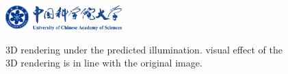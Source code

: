 \begin{figure}[!htbp]
    \centering
    \includegraphics[width=0.40\textwidth]{Img/ucas_logo.pdf}

    {3D rendering under the predicted illumination.
    visual effect of the 3D rendering is in line with the original image.}
    
    \label{fig:demo-problem-define}
\end{figure}